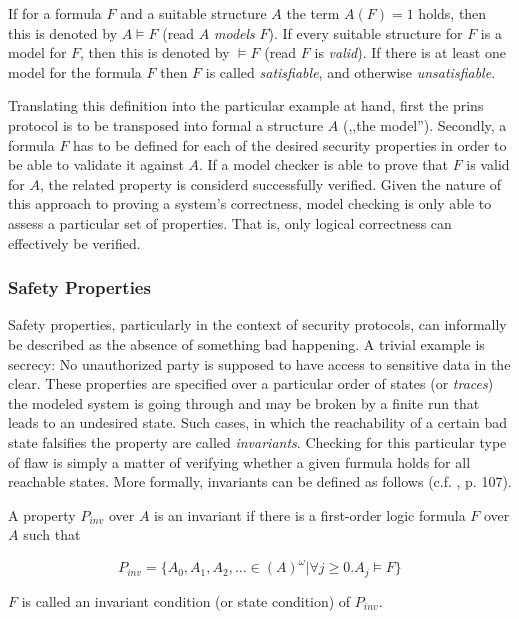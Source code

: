 If for a formula $F$ and a suitable structure $A$ the term $A(F) = 1$ holds, then this is denoted by $A \models F$ (read $A$ \textit{models} $F$).
If every suitable structure for $F$ is a model for $F$, then this is denoted by $\models F$ (read $F$ is \textit{valid}).
If there is at least one model for the formula $F$ then $F$ is called \textit{satisfiable}, and otherwise \textit{unsatisfiable}.

Translating this definition into the particular example at hand, first the \gls{prins} protocol is to be transposed into formal a structure $A$ (,,the model'').
Secondly, a formula $F$ has to be defined for each of the desired security properties in order to be able to validate it against $A$.
If a model checker is able to prove that $F$ is valid for $A$, the related property is considerd successfully verified.
Given the nature of this approach to proving a system's correctness, model checking is only able to assess a particular set of properties.
That is, only logical correctness can effectively be verified.

\subsubsection{Safety Properties}

Safety properties, particularly in the context of security protocols, can informally be described as the absence of something bad happening.
A trivial example is secrecy: No unauthorized party is supposed to have access to sensitive data in the clear.
These properties are specified over a particular order of states (or \textit{traces}) the modeled system is going through and may be broken by a finite run that leads to an undesired state.
Such cases, in which the reachability of a certain bad state falsifies the property are called \textit{invariants}.
Checking for this particular type of flaw is simply a matter of verifying whether a given furmula holds for all reachable states.
More formally, invariants can be defined as follows (c.f. \cite{baier2008principles}, p. 107).

A property $P_{inv}$ over $A$ is an invariant if there is a first-order logic formula $F$ over $A$ such that

\begin{equation*}
    P_{inv} = \{ A_0, A_1, A_2, \ldots \in (A)^\omega | \forall j \geq 0. A_j \models F \}
\end{equation*}

\noindent
$F$ is called an invariant condition (or state condition) of $P_{inv}$.

